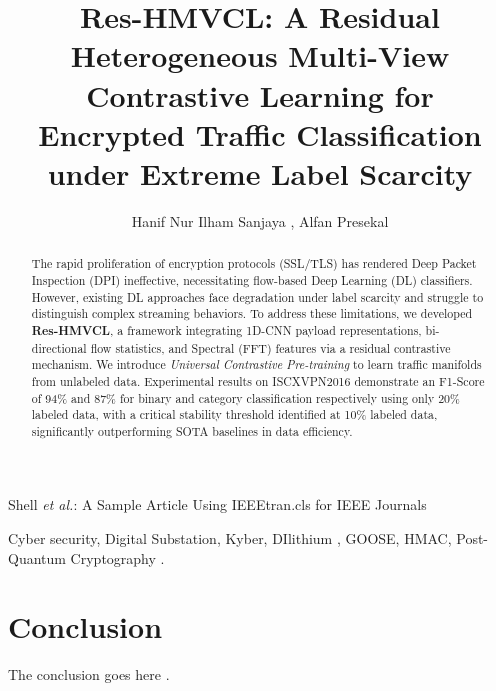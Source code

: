 \documentclass[lettersize,journal]{IEEEtran}
\begin{document}
\title{Res-HMVCL: A Residual Heterogeneous Multi-View Contrastive Learning for Encrypted Traffic Classification under Extreme Label Scarcity}

\author{Hanif Nur Ilham Sanjaya , Alfan Presekal}

%
{Shell \MakeLowercase{\textit{et al.}}: A Sample Article Using IEEEtran.cls for IEEE Journals}


\maketitle

\begin{abstract}
 The rapid proliferation of encryption protocols (SSL/TLS) has rendered Deep Packet Inspection (DPI) ineffective, necessitating flow-based Deep Learning (DL) classifiers. However, existing DL approaches face degradation under label scarcity and struggle to distinguish complex streaming behaviors. To address these limitations, we developed \textbf{Res-HMVCL}, a framework integrating 1D-CNN payload representations, bi-directional flow statistics, and Spectral (FFT) features via a residual contrastive mechanism. We introduce \textit{Universal Contrastive Pre-training} to learn traffic manifolds from unlabeled data. Experimental results on ISCXVPN2016 demonstrate an F1-Score of 94\% and 87\% for binary and category classification respectively using only 20\% labeled data, with a critical stability threshold identified at 10\% labeled data, significantly outperforming SOTA baselines in data efficiency.
\end{abstract}

\begin{IEEEkeywords}
Cyber security, Digital Substation, Kyber, DIlithium , GOOSE, HMAC, Post-Quantum Cryptography .
\end{IEEEkeywords}





\section{Conclusion}
The conclusion goes here \cite{ref1}.
\end{document}
